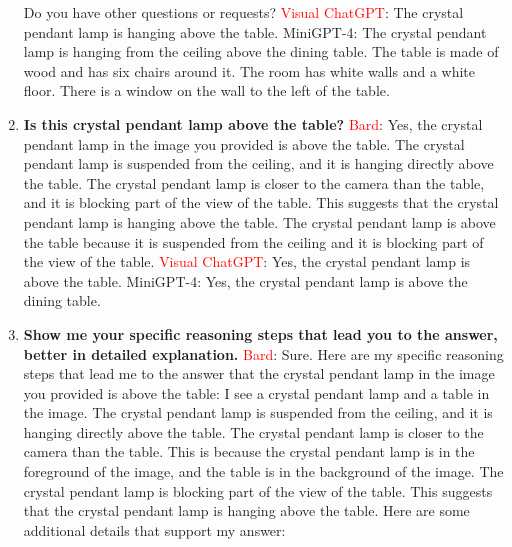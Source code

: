 \begin{enumerate}
    Do you have other questions or requests?
    \subitem \textcolor{red}{Visual ChatGPT}: The crystal pendant lamp is hanging above the table.
    \subitem MiniGPT-4: The crystal pendant lamp is hanging from the ceiling above the dining table. The table is made of wood and has six chairs around it. The room has white walls and a white floor. There is a window on the wall to the left of the table.
    \item \textbf{Is this crystal pendant lamp above the table?}
    \subitem \textcolor{Red}{Bard}: Yes, the crystal pendant lamp in the image you provided is above the table. The crystal pendant lamp is suspended from the ceiling, and it is hanging directly above the table. The crystal pendant lamp is closer to the camera than the table, and it is blocking part of the view of the table. This suggests that the crystal pendant lamp is hanging above the table. The crystal pendant lamp is above the table because it is suspended from the ceiling and it is blocking part of the view of the table.
    \subitem \textcolor{red}{Visual ChatGPT}: Yes, the crystal pendant lamp is above the table.
    \subitem MiniGPT-4: Yes, the crystal pendant lamp is above the dining table.
    \item \textbf{Show me your specific reasoning steps that lead you to the answer, better in detailed explanation.}
    \subitem \textcolor{Red}{Bard}: 
    Sure. Here are my specific reasoning steps that lead me to the answer that the crystal pendant lamp in the image you provided is above the table:
    I see a crystal pendant lamp and a table in the image.
    The crystal pendant lamp is suspended from the ceiling, and it is hanging directly above the table.
    The crystal pendant lamp is closer to the camera than the table. This is because the crystal pendant lamp is in the foreground of the image, and the table is in the background of the image.
    The crystal pendant lamp is blocking part of the view of the table. This suggests that the crystal pendant lamp is hanging above the table.
    Here are some additional details that support my answer:


\end{enumerate}
